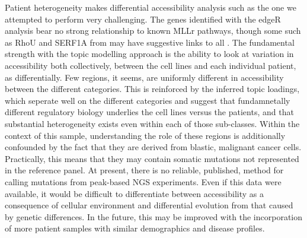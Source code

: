 Patient heterogeneity makes differential accessibility analysis such as the one we attempted to perform very challenging. The genes identified with the edgeR analysis bear no strong relationship to known MLLr pathways, though some such as RhoU and SERF1A from  may have suggestive links to \gls{all} \cite{Infante2013a,Z2020,Wilson2016}. The fundamental strength with the topic modelling approach is the ability to look at variation in accessibility both collectively, between the cell lines and each individual patient, as differentially. Few regions, it seems, are uniformly different in accessibility between the different categories. This is reinforced by the inferred topic loadings, which seperate well on the different categories and suggest that fundamnetally different regulatory biology underlies the cell lines versus the patients, and that substantial heterogeneity exists even within each of those sub-classes.  Within the context of this sample, understanding the role of these regions is additionally confounded by the fact that they are derived from blastic, malignant cancer cells. Practically, this means that they may contain somatic mutations not represented in the reference panel. At present, there is no reliable, published, method for calling mutations from peak-based NGS experiments. Even if this data were available, it would be difficult to differentiate between accessibility as a consequence of cellular environment and differential evolution from that caused by genetic differences. In the future, this may be improved with the incorporation of more patient samples with similar demographics and disease profiles.


